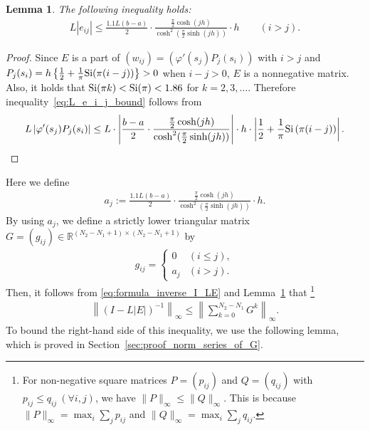 \documentclass[pdflatex,sn-mathphys-num]{sn-jnl}%
\theoremstyle{thmstyleone}%
\theoremstyle{thmstyletwo}%
\newtheorem{lemma}{Lemma}%
\theoremstyle{thmstylethree}%
\begin{document}
\begin{lemma}
\label{lem:L_e_ij_ub}
The following inequality holds:
\begin{align}
L |e_{ij}| 
\leq 
\frac{1.1L(b-a)}{2} \cdot \frac{ \frac{\pi}{2} \cosh(jh) }{ \cosh^{2}(\frac{\pi}{2} \sinh(jh)) } \cdot h
\qquad
(i > j).
\label{eq:L_e_i_j_bound}
\end{align}
\end{lemma}

\begin{proof}
Since $E$ is a part of $(w_{ij})=(\varphi'(s_j)P_j(s_i))$ with $i>j$ and $P_j(s_i)= h\left\{\frac{1}{2}+\frac{1}{\pi}{\rm Si}(\pi(i-j))\right\}>0$ when $i-j>0$, $E$ is a nonnegative matrix. 
Also, it holds that ${\rm Si}(\pi k)<{\rm Si}(\pi)<1.86$ for $k=2,3,\ldots$. 
Therefore inequality~\eqref{eq:L_e_i_j_bound} follows from 
\begin{align}
L\left| \varphi'(s_{j}) P_{j}(s_{i}) \right|
\leq
L \cdot 
\left|
\frac{b-a}{2} \cdot 
\frac{ \frac{\pi}{2} \cosh(jh) }{ \cosh^{2}(\frac{\pi}{2} \sinh(jh)) }
\right|
\cdot
h 
\cdot
\left| \frac{1}{2} + \frac{1}{\pi} \mathrm{Si}\left( \pi (i - j) \right) \right|.
\notag
\end{align}
\end{proof}

\noindent
Here we define 
\begin{align}
a_{j} 
:= 
\frac{1.1L(b-a)}{2} \cdot \frac{ \frac{\pi}{2} \cosh(jh) }{ \cosh^{2}(\frac{\pi}{2} \sinh(jh)) } \cdot h.
\label{eq:def_a_j}
\end{align}
By using $a_{j}$, 
we define a strictly lower triangular matrix $G = (g_{ij}) \in \mathbb{R}^{(N_{2} - N_{1} + 1) \times (N_{2} - N_{1} + 1)}$ by
\begin{align}
g_{ij} = 
\begin{cases}
0 & (i \leq j), \\
a_{j} & (i > j).
\end{cases} 
\label{eq:def_matrix_G}
\end{align}
Then, 
it follows from \eqref{eq:formula_inverse_I_LE} and Lemma~\ref{lem:L_e_ij_ub} that%
\footnote{
For non-negative square matrices $P = (p_{ij})$ and $Q = (q_{ij})$ with $p_{ij} \leq q_{ij} \ (\forall i,j)$, 
we have $\| P \|_{\infty} \leq \| Q \|_{\infty}$.  
This is because 
\(
\| P \|_{\infty} = \max_{i} \sum_{j} p_{ij}
\) 
and 
\(
\| Q \|_{\infty} = \max_{i} \sum_{j} q_{ij}
\).
}
\begin{align}
\left\| (I - L |E|)^{-1} \right\|_{\infty} 
\leq 
\left\| 
\sum_{k=0}^{N_{2} - N_{1}} G^{k}
\right\|_{\infty}.
\label{eq:key_est_inv_I_LE}
\end{align}
To bound the right-hand side of this inequality, 
we use the following lemma, 
which is proved in Section~\ref{sec:proof_norm_series_of_G}. 
\end{document}
